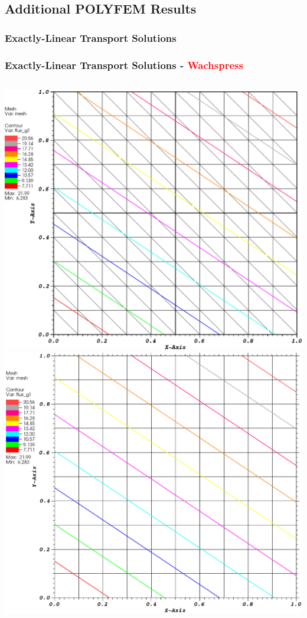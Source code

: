 \documentclass[compress,10pt]{beamer}
\newcommand{\tcr}[1]{\textcolor{red}{#1}}
\begin{document}
\subsection{Additional POLYFEM Results}
\begin{frame}[t]\frametitle{Exactly-Linear Transport Solutions}
{
\frametitle{Exactly-Linear Transport Solutions - \tcr{Wachspress}}
\centering
\begin{columns}
\centering
{}\includegraphics[width=0.95\columnwidth]{images/tri_WACHSPRESS_k1.eps} \\
\vspace{3mm}
{}\includegraphics[width=0.95\columnwidth]{images/cart_WACHSPRESS_k1.eps}

\end{columns}}
\end{frame}
\end{document}
